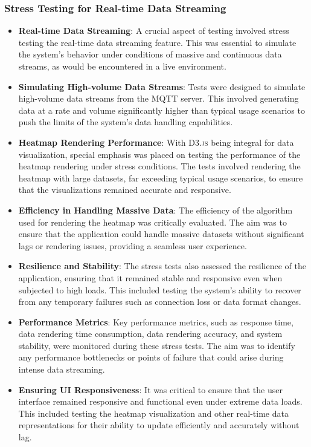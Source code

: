 \subsubsection{Stress Testing for Real-time Data Streaming}
\begin{itemize}
  \item \textbf{Real-time Data Streaming}: A crucial aspect of testing involved stress testing the real-time data streaming feature. This was essential to simulate the system's behavior under conditions of massive and continuous data streams, as would be encountered in a live environment.
  \item \textbf{Simulating High-volume Data Streams}: Tests were designed to simulate high-volume data streams from the MQTT server. This involved generating data at a rate and volume significantly higher than typical usage scenarios to push the limits of the system's data handling capabilities.
  \item \textbf{Heatmap Rendering Performance}: With \textsc{D3.js} being integral for data visualization, special emphasis was placed on testing the performance of the heatmap rendering under stress conditions. The tests involved rendering the heatmap with large datasets, far exceeding typical usage scenarios, to ensure that the visualizations remained accurate and responsive.
  \item \textbf{Efficiency in Handling Massive Data}: The efficiency of the algorithm used for rendering the heatmap was critically evaluated. The aim was to ensure that the application could handle massive datasets without significant lags or rendering issues, providing a seamless user experience.
  \item \textbf{Resilience and Stability}: The stress tests also assessed the resilience of the application, ensuring that it remained stable and responsive even when subjected to high loads. This included testing the system's ability to recover from any temporary failures such as connection loss or data format changes.
  \item \textbf{Performance Metrics}: Key performance metrics, such as response time, data rendering time consumption, data rendering accuracy, and system stability, were monitored during these stress tests. The aim was to identify any performance bottlenecks or points of failure that could arise during intense data streaming.
  \item \textbf{Ensuring UI Responsiveness}: It was critical to ensure that the user interface remained responsive and functional even under extreme data loads. This included testing the heatmap visualization and other real-time data representations for their ability to update efficiently and accurately without lag.
\end{itemize}

